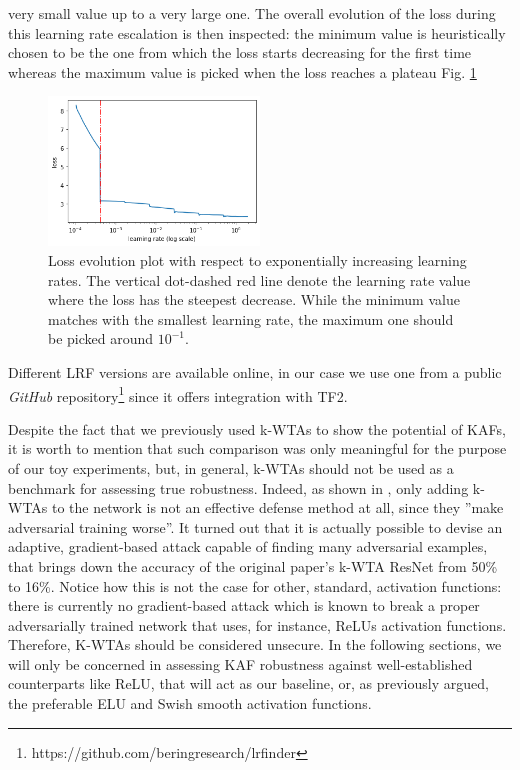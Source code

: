 \documentclass[LaM,binding=0.6cm]{./packages/sapthesis/sapthesis}
\begin{document}
very small value up to a very large one. The overall evolution of the loss 
during this learning rate escalation is then inspected: the minimum value is 
heuristically chosen to be the one from which the loss starts decreasing for the first time 
whereas the maximum value is picked when the loss reaches a plateau Fig. \ref{fig:lrf}
\begin{figure}[h!]
    \centering
    \includegraphics[width=0.50\textwidth]{lrf}
    \caption{Loss evolution plot with respect to exponentially increasing learning rates. The 
    vertical dot-dashed red line denote the learning rate value where the loss has the steepest decrease.
    While the minimum value matches with the smallest learning rate, the maximum one should be picked around
    $10^{-1}$.}
    \label{fig:lrf}
\end{figure}
Different LRF versions are available online, in our case we use one from a public \textit{GitHub} repository\footnote{https://github.com/beringresearch/lrfinder}
since it offers integration with TF2.

Despite the fact that we previously used k-WTAs to show the potential of KAFs, it is worth to 
mention that such comparison was only meaningful for the purpose of our toy experiments, but, in general, 
k-WTAs should not be used as a benchmark for assessing true robustness.
Indeed, as shown in \cite{carlinikwta}, only adding k-WTAs to the network 
is not an effective defense method at all, since they ''make adversarial training worse''.
It turned out that it is actually possible to devise an adaptive, gradient-based attack capable 
of finding many adversarial examples, that brings down the accuracy of the original paper's k-WTA ResNet from 50\% to 16\%. 
Notice how this is not the case for other, standard, activation 
functions: there is currently no gradient-based attack which is known to break a proper adversarially trained network that uses, for instance,
ReLUs activation functions. Therefore, K-WTAs should be considered unsecure. In the following 
sections, we will only be concerned in assessing KAF robustness against well-established counterparts 
like ReLU, that will act as our baseline, or, as previously argued, the preferable ELU and 
Swish smooth activation functions.
\end{document}
